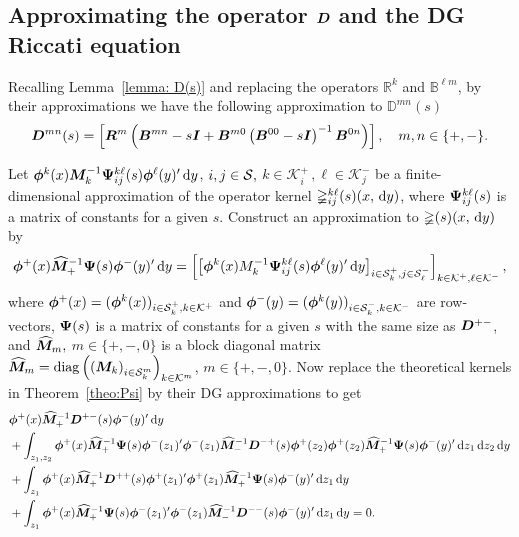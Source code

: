 \subsection{Approximating the operator \(\boldsymbol D\) and the DG Riccati equation}
Recalling Lemma~\ref{lemma: D(s)} and replacing the operators \(\mathbb R^k\) and \(\mathbb B^{\ell m}\), by their approximations we have the following approximation to \(\mathbb D^{mn}(s)\)
\begin{align*}
		 {\boldsymbol D}^{mn}(s) = \left[ \boldsymbol {R}^{m}\left(
		{ {\boldsymbol B}}^{mn} - s{\boldsymbol I} + { {\boldsymbol B}}^{m0 }\left({ {\boldsymbol B}}^{00}- s\boldsymbol I \right)^{-1} { {\boldsymbol B}}^{0n}\right)\right],\quad m,n \in\{+,-\}.
\end{align*} 

Let \(\boldsymbol\phi^k(x){\boldsymbol M}_k^{-1}\boldsymbol \Psi_{ij}^{k\ell}(s)\boldsymbol\phi^\ell(y)'{}\, \mathrm{d} y\), \(i,j\in\mathcal{S},\) \(k\in\mathcal K_i^+\,, \ell\in\mathcal K_j^-\) be a finite-dimensional approximation of the operator kernel \(\mathbb\Psi_{ij}^{k\ell}(s)(x,\, \mathrm{d} y)\), where \(\boldsymbol \Psi_{ij}^{k\ell}(s)\) is a matrix of constants for a given \(s\). Construct an approximation to \(\mathbb\Psi(s)(x,\, \mathrm{d} y)\) by 
\[\boldsymbol\phi^+(x)\widehat{\boldsymbol M}_+^{-1}\boldsymbol \Psi(s)\boldsymbol\phi^-(y)'{}\, \mathrm{d} y = \left[\left[\boldsymbol\phi^k(x){M}_k^{-1}\boldsymbol \Psi_{ij}^{k\ell}(s)\boldsymbol\phi^\ell(y)'{}\, \mathrm{d} y\right]_{i\in\mathcal{S}_k^+,j\in\mathcal{S}_\ell^-}\right]_{ k\in\mathcal K^+, \ell\in\mathcal K^-},\]
where \(\boldsymbol\phi^+(x) = (\boldsymbol\phi^k(x))_{i\in\mathcal{S}_k^+,k\in\mathcal K^+}\) and \(\boldsymbol\phi^-(y) = (\boldsymbol\phi^k(y))_{i\in\mathcal{S}_k^-,k\in\mathcal K^-}\) are row-vectors, \(\boldsymbol \Psi(s)\) is a matrix of constants for a given \(s\) with the same size as \(\boldsymbol D^{+-}\), and \(\widehat{\boldsymbol M}_m,\) \(m\in\{+,-,0\}\) is a block diagonal matrix \(\widehat{\boldsymbol M}_m = \mathrm{diag}\left( \left( \boldsymbol M_k\right)_{i\in\mathcal{S}_k^m}\right)_{k\in\mathcal K^m}\), \(m\in\{+,-,0\}\). Now replace the theoretical kernels in Theorem~\ref{theo:Psi} by their DG approximations to get 
\begin{align*}
&\boldsymbol\phi^+(x)\widehat{\boldsymbol M}_+^{-1}  \boldsymbol D^{+-}(s)\boldsymbol\phi^-(y)'{}\, \mathrm{d} y
\\&{}+ \int_{z_1,z_2}\boldsymbol\phi^+(x)\widehat{\boldsymbol M}_+^{-1}\boldsymbol \Psi(s)\boldsymbol\phi^-(z_1)'{}\boldsymbol\phi^-(z_1) \widehat{\boldsymbol M}_-^{-1}  \boldsymbol D^{-+}(s)\boldsymbol\phi^+(z_2)\boldsymbol\phi^+(z_2)\widehat{\boldsymbol M}_+^{-1}\boldsymbol \Psi(s)\boldsymbol\phi^-(y)'{}\, \mathrm{d} z_1\, \mathrm{d} z_2\, \mathrm{d} y
\\&{}+ \int_{z_1}\boldsymbol\phi^+(x)\widehat{\boldsymbol M}_+^{-1}  \boldsymbol D^{++}(s)\boldsymbol\phi^+(z_1)'{}\boldsymbol\phi^+(z_1) \widehat{\boldsymbol M}_+^{-1}\boldsymbol \Psi(s)\boldsymbol\phi^-(y)'{}\, \mathrm{d} z_1\, \mathrm{d} y
\\&{}+ \int_{z_1}\boldsymbol\phi^+(x)\widehat{\boldsymbol M}_+^{-1}\boldsymbol \Psi(s)\boldsymbol\phi^-(z_1)'{}\boldsymbol\phi^-(z_1)\widehat{\boldsymbol M}_-^{-1}  \boldsymbol D^{--}(s)\boldsymbol\phi^-(y)'{}\, \mathrm{d} z_1\, \mathrm{d} y
= 0.
\end{align*}
